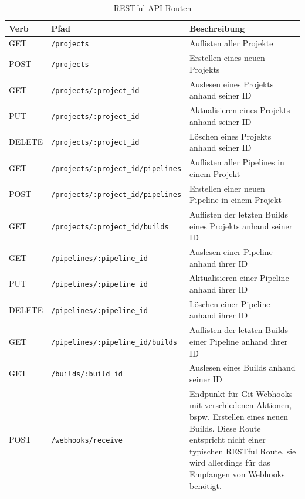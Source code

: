 \begin{table}[H]
  \footnotesize
  \begin{tabularx}{\textwidth}{| l | l | X |}
    \hline
    \textbf{Verb} & \textbf{Pfad} & \textbf{Beschreibung} \\ \hline
    GET & {\scriptsize \texttt{/projects}} & Auflisten aller Projekte \\ \hline
    POST & {\scriptsize \texttt{/projects}} & Erstellen eines neuen Projekts \\ \hline
    GET & {\scriptsize \texttt{/projects/:project\_id}} & Auslesen eines Projekts anhand seiner ID \\ \hline
    PUT & {\scriptsize \texttt{/projects/:project\_id}} & Aktualisieren eines Projekts anhand seiner ID \\ \hline
    DELETE & {\scriptsize \texttt{/projects/:project\_id}} & Löschen eines Projekts anhand seiner ID \\ \hline
    GET & {\scriptsize \texttt{/projects/:project\_id/pipelines}} & Auflisten aller Pipelines in einem Projekt \\ \hline
    POST & {\scriptsize \texttt{/projects/:project\_id/pipelines}} & Erstellen einer neuen Pipeline in einem Projekt \\ \hline
    GET & {\scriptsize \texttt{/projects/:project\_id/builds}} & Auflisten der letzten Builds eines Projekts anhand seiner ID \\ \hline
    GET & {\scriptsize \texttt{/pipelines/:pipeline\_id}} & Auslesen einer Pipeline anhand ihrer ID \\ \hline
    PUT & {\scriptsize \texttt{/pipelines/:pipeline\_id}} & Aktualisieren einer Pipeline anhand ihrer ID \\ \hline
    DELETE & {\scriptsize \texttt{/pipelines/:pipeline\_id}} & Löschen einer Pipeline anhand ihrer ID \\ \hline
    GET & {\scriptsize \texttt{/pipelines/:pipeline\_id/builds}} & Auflisten der letzten Builds einer Pipeline anhand ihrer ID \\ \hline
    GET & {\scriptsize \texttt{/builds/:build\_id}} & Auslesen eines Builds anhand seiner ID \\
    \hline\hline
    POST & {\scriptsize \texttt{/webhooks/receive}} & Endpunkt für Git Webhooks mit verschiedenen Aktionen, bspw. Erstellen eines neuen Builds. Diese Route entspricht nicht einer typischen RESTful Route, sie wird allerdings für das Empfangen von Webhooks benötigt. \\
    \hline
  \end{tabularx}
  \caption{RESTful API Routen}
  \label{tab:rest-routes}
\end{table}

